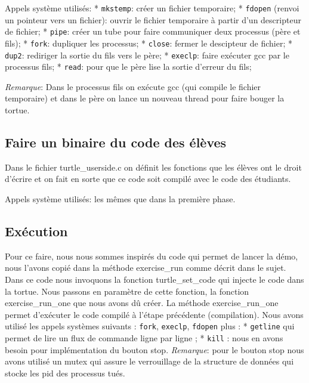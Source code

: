 \documentclass[a4paper, 12pt]{article}
\begin{document}
Appels système utilisés: \newline
	* \texttt{mkstemp}: créer un fichier temporaire; \newline
	* \texttt{fdopen} (renvoi un pointeur vers un fichier): ouvrir le fichier temporaire à partir d'un descripteur de fichier; \newline
	* \texttt{pipe}: créer un tube pour faire communiquer deux processus (père et fils); \newline
	* \texttt{fork}: dupliquer les processus; \newline
	* \texttt{close}: fermer le descipteur de fichier; \newline
	* \texttt{dup2}: rediriger la sortie du fils vers le père; \newline
	* \texttt{execlp}: faire exécuter gcc par le processus fils; \newline
	* \texttt{read}: pour que le père lise la sortie d'erreur du fils; \newline
	
\emph{Remarque}: Dans le processus fils on exécute gcc (qui compile le fichier temporaire) et dans le père on lance un nouveau thread pour faire bouger la tortue.
\subsection{Faire un binaire du code des élèves}
Dans le fichier turtle\_userside.c on définit les fonctions que les élèves ont le droit d'écrire et on fait en sorte que ce code soit compilé avec le code des étudiants.

Appels système utilisés: les mêmes que dans la première phase.
\subsection{Exécution}
Pour ce faire, nous nous sommes inspirés du code qui permet de lancer la démo, nous l'avons copié dans la méthode exercise\_run comme décrit dans le sujet.
Dans ce code nous invoquons la fonction turtle\_set\_code qui injecte le code dans la tortue.
Nous passons en paramètre de cette fonction, la fonction exercise\_run\_one que nous avons dû créer.
La méthode exercise\_run\_one permet d'exécuter le code compilé à l'étape précédente (compilation).
Nous avons utilisé les appels systèmes suivants : \texttt{fork}, \texttt{execlp}, \texttt{fdopen} plus : \newline
* \texttt{getline} qui permet de lire un flux de commande ligne par ligne ;\newline
* \texttt{kill} : nous en avons besoin pour implémentation du bouton stop.\newline
\emph{Remarque}: pour le bouton stop nous avons utilisé un mutex qui assure le verrouillage de la structure de données qui stocke les pid des processus tués.
\end{document}
